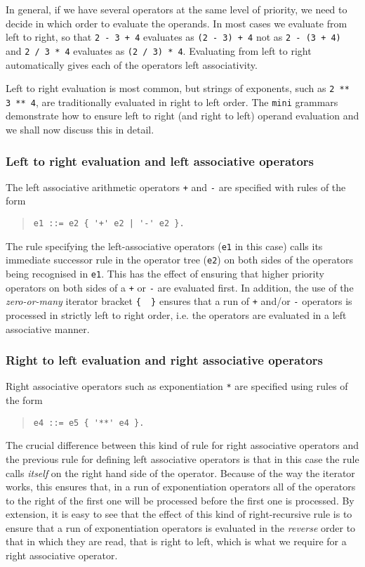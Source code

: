 {In general, if we have several operators at the same level of priority, we need
to decide in which order to evaluate the operands. In most cases we evaluate
from left to right, so that \verb|2 - 3 + 4| evaluates as \verb|(2 - 3) + 4|
not as \verb|2 - (3 + 4)| and \verb|2 / 3 * 4| evaluates as \verb|(2 / 3) * 4|.
Evaluating from left to right automatically gives each of the operators
left associativity.

Left to right evaluation is most common, but strings of exponents, such as
\verb|2 ** 3 ** 4|, are traditionally evaluated in right to left order.
The {\tt mini} grammars demonstrate how to ensure left to right
(and right to left) operand evaluation and we shall now discuss this
in detail.

\subsubsection{Left to right evaluation and left associative operators}

The left associative arithmetic operators {\tt +} and {\tt -}
are specified with rules of the form
\begin{quote}
\small
\begin{verbatim}
e1 ::= e2 { '+' e2 | '-' e2 }.         
\end{verbatim}
\end{quote}
The rule specifying the left-associative operators ({\tt e1} in this case) calls its
immediate successor rule in the operator tree ({\tt e2}) on both sides of the operators
being recognised in {\tt e1}. This has the effect of ensuring that higher priority operators
on both sides of a {\tt +} or {\tt -} are evaluated first. In addition, the use of the
{\em zero-or-many} iterator bracket \verb+{  }+ ensures that a run of {\tt +} and/or {\tt -}
operators is processed in strictly left to right order, i.e. the operators are evaluated
in a left associative manner.

\subsubsection{Right to left evaluation and right associative operators}
Right associative operators such as exponentiation {\tt **} are specified using rules of
the form
\begin{quote}
\small
\begin{verbatim}
e4 ::= e5 { '**' e4 }.
\end{verbatim}
\end{quote}
The crucial difference between this kind of rule for right associative operators and the
previous rule for defining left associative operators is that in this case the rule calls
{\em itself} on the right hand side of the operator. Because of the way the
iterator works, this ensures that, in a run of
exponentiation operators all of the operators to the right of the first one will be processed
before the first one is processed. By extension, it is easy to see that the effect of this
kind of right-recursive rule is to ensure that a run of exponentiation operators is
evaluated in the {\em reverse} order to that in which they are read, that is right to left,
which is what we require for a right associative operator.

}
